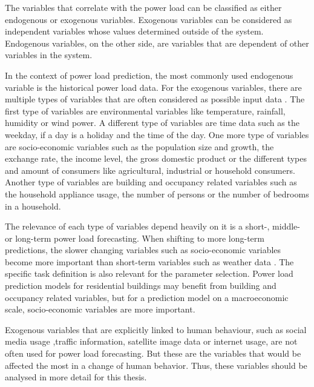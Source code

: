 The variables that correlate with the power load 
can be classified as either endogenous or exogenous variables.
Exogenous variables can be considered as independent variables 
whose values determined outside of the system. 
Endogenous variables, on the other side, 
are variables that are dependent of other variables in the 
system.

In the context of power load prediction, the most commonly 
used endogenous variable is the historical power load data.
For the exogenous variables, there are multiple types of 
variables that are often considered as possible input data \cite{exogenousdata}
\cite{exogenousdata2}.
The first type of variables are environmental variables like temperature, 
rainfall, humidity or wind power. A different type of variables are time data
such as the weekday, if a day is a holiday and the time of the day.
One more type of variables are socio-economic variables such as the
population size and growth, the exchange rate, the income level,
the gross domestic product or the different types and amount 
of consumers like agricultural, industrial or household consumers.
Another type of variables are building and occupancy related variables such
as the household appliance usage,
the number of persons or the number of bedrooms in a household.

The relevance of each type of variables depend heavily on it is
a short-, middle- or long-term power load forecasting. When shifting to more 
long-term predictions, the slower changing variables such as socio-economic
variables become more important than short-term variables such as weather data 
\cite{loadforecastingtimedependency2}\cite{loadforecastingtimedependency}.
The specific task definition is also relevant for the parameter selection.
Power load prediction models for residential buildings may benefit from 
building and occupancy related variables, but for a prediction model on a 
macroeconomic scale, socio-economic variables are more important.

Exogenous variables that are explicitly linked to human behaviour, 
such as social media usage ,traffic information,  
satellite image data or internet usage, are not often 
used for power load forecasting. 
But these are the variables that would be affected the most in a change of 
human behavior. Thus, these variables should be analysed in more detail 
for this thesis.

